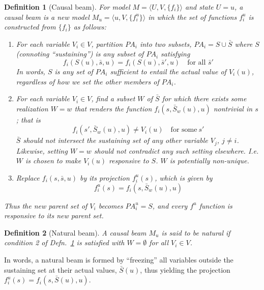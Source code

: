 \documentclass[11pt]{article}
\numberwithin{equation}{section}
\newtheorem{defn}{Definition}[section]
\begin{document}
\begin{defn}[Causal beam] \label{defn:causal-beam}
For model $M=\langle U, V, \{f_i\}\rangle$ and state $U=u$, a causal beam is a new model $M_u=\langle u, V, \{f_i^u\} \rangle$ in which the set of functions $f_i^u$ is constructed from $\{f_i\}$ as follows:
\begin{enumerate}[noitemsep]
\item For each variable $V_i \in V$, partition $PA_i$ into two subsets, $PA_i=S \cup \bar{S}$ where $S$ (connoting ``sustaining'') is any subset of $PA_i$ satisfying 
\begin{equation}
f_i(S(u), \bar{s}, u) = f_i(S(u), \bar{s}', u) \quad \text{for all } \bar{s}' 
\end{equation}
In words, $S$ is any set of $PA_i$ sufficient to entail the actual value of $V_i(u)$, regardless of how we set the other members of $PA_i$.
\item For each variable $V_i \in V$, find a subset $W$ of $\bar{S}$ for which there exists some realization $W=w$ that renders the function $f_i(s, \bar{S}_w(u), u)$ nontrivial in $s$; that is
\begin{equation}
f_i(s', \bar{S}_w(u), u) \neq V_i(u) \quad \text{for some}\ s'
\end{equation}
$\bar{S}$ should not intersect the sustaining set of any other variable $V_j$, $j \neq i$. Likewise, setting $W=w$ should not contradict any such setting elsewhere. I.e. $W$ is chosen to make $V_i(u)$ responsive to $S$. $W$ is potentially non-unique. 
\item Replace $f_i(s, \bar{s}, u)$ by its projection $f_i^u(s)$, which is given by
\begin{equation}
f_i^u(s) = f_i(s, \bar{S}_w(u), u)
\end{equation}
\end{enumerate}
Thus the new parent set of $V_i$ becomes $PA_i^u=S$, and every $f^u$ function is responsive to its new parent set.
\end{defn}

\begin{defn}[Natural beam]
A causal beam $M_u$ is said to be natural if condition 2 of Defn.~\ref{defn:causal-beam} is satisfied with $W=\emptyset$ for all $V_i \in V$.
\end{defn}

In words, a natural beam is formed by ``freezing'' all variables outside the sustaining set at their actual values, $\bar{S}(u)$, thus yielding the projection $f_i^u(s)=f_i(s,\bar{S}(u), u)$.
\end{document}
